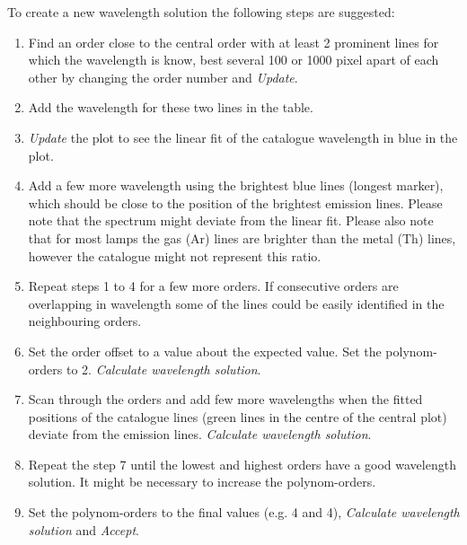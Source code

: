\documentclass[10pt,a4paper]{article}
\begin{document}
To create a new wavelength solution the following steps are suggested:
\begin{enumerate}\setlength\itemsep{0em}
  \item Find an order close to the central order with at least 2 prominent lines for which the wavelength is know, best several 100 or 1000 pixel apart of each other by changing the order number and \textit{Update}.
  \item Add the wavelength for these two lines in the table.
  \item \textit{Update} the plot to see the linear fit of the catalogue wavelength in blue in the plot.
  \item Add a few more wavelength using the brightest blue lines (longest marker), which should be close to the position of the brightest emission lines. Please note that the spectrum might deviate from the linear fit. Please also note that for most lamps the gas (Ar) lines are brighter than the metal (Th) lines, however the catalogue might not represent this ratio.
  \item Repeat steps 1 to 4 for a few more orders. If consecutive orders are overlapping in wavelength some of the lines could be easily identified in the neighbouring orders.
  \item Set the order offset to a value about the expected value. Set the polynom-orders to 2. \textit{Calculate wavelength solution}.
  \item Scan through the orders and add few more wavelengths when the fitted positions of the catalogue lines (green lines in the centre of the central plot) deviate from the emission lines. \textit{Calculate wavelength solution}.
  \item Repeat the step 7 until the lowest and highest orders have a good wavelength solution. It might be necessary to increase the polynom-orders.
  \item Set the polynom-orders to the final values (e.g. 4 and 4), \textit{Calculate wavelength solution} and \textit{Accept}.
\end{enumerate}
\end{document}

